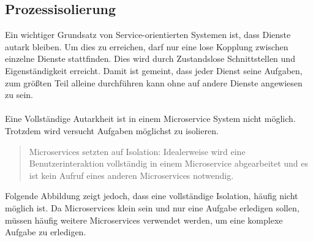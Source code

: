 \subsection{Prozessisolierung}
\label{subsec:Prozessisiolierung}
Ein wichtiger Grundsatz von Service-orientierten Systemen ist, dass Dienste autark bleiben. Um dies zu erreichen, darf nur eine lose Kopplung zwischen einzelne Dienste stattfinden. Dies wird durch Zustandslose Schnittstellen und Eigenständigkeit erreicht. Damit ist gemeint, dass jeder Dienst seine Aufgaben, zum größten Teil alleine durchführen kann ohne auf andere Dienste angewiesen zu sein.
\\\\
Eine Vollständige Autarkheit ist in einem Microservice System nicht möglich. Trotzdem wird versucht Aufgaben möglichst zu isolieren.

\begin{quotation}
	\frqq Microservices setzten auf Isolation: Idealerweise wird eine Benutzerinteraktion vollständig in einem Microservice abgearbeitet und es ist kein Aufruf eines anderen Microservices notwendig.\flqq\ \cite[S. 90]{EWolff2016:Microservices}
\end{quotation}

Folgende Abbildung zeigt jedoch, dass eine vollständige Isolation, häufig nicht möglich ist. Da Microservices klein sein und nur eine Aufgabe erledigen sollen, müssen häufig weitere Microservices verwendet werden, um eine komplexe Aufgabe zu erledigen.

